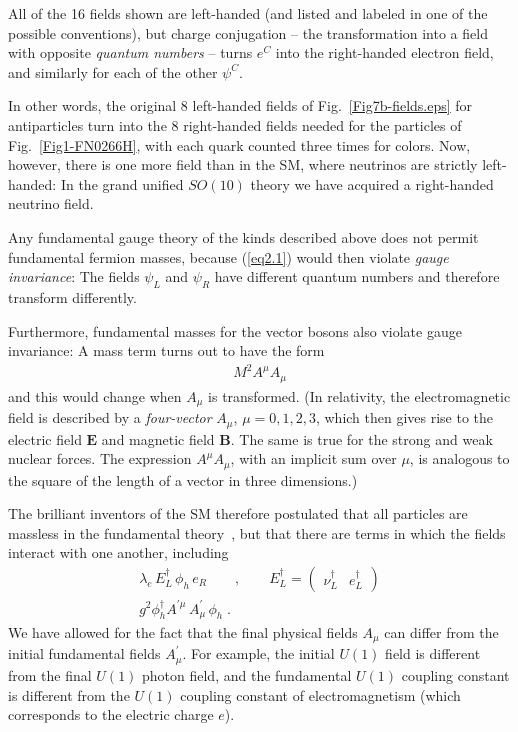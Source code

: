 \documentclass[12pt]{iopart}
\begin{document}
All of the 16 fields shown are left-handed (and listed and labeled in one of the possible conventions), but charge conjugation -- the transformation into a field with opposite \textit{quantum numbers} -- turns $e^{C}$ into the right-handed electron field, and similarly for each of the other $\psi ^C$. 

In other words, the original 8 left-handed fields of Fig.~\ref{Fig7b-fields.eps} for antiparticles turn into the 8 right-handed fields needed for the particles of Fig.~\ref{Fig1-FN0266H}, with each quark counted three times for colors. Now, however, there is one more field than in the SM, where neutrinos are strictly left-handed: In the grand unified $SO(10)$ theory we have acquired a right-handed neutrino field.  

Any fundamental gauge theory of the kinds described above does not permit fundamental fermion masses, because (\ref{eq2.1}) would then violate \textit{gauge invariance}: The fields $\psi _{L}$ and $\psi _{R}$ have different quantum numbers and therefore transform differently. 

Furthermore, fundamental masses for the vector bosons also violate gauge invariance: A mass term turns out to have the form
\begin{eqnarray}
M^{2}A^{\mu }A_{\mu }
\label{eq2.3}
\end{eqnarray}
and this would change when $A_{\mu }$ is transformed. (In relativity, the electromagnetic field is described by a \textit{four-vector} $A_{\mu }$, $\mu=0,1,2,3$,  which then gives rise to the electric field $\mathbf{E}$ and magnetic field $\mathbf{B}$. The same is true for the strong and weak nuclear forces. The expression $A^{\mu }A_{\mu }$, with an implicit sum over $\mu$, is analogous to the square of the length of a vector in three dimensions.)

The brilliant inventors of the SM therefore postulated that all particles are massless in the fundamental theory~\cite{Weinberg,Salam}, but that there are terms in which the fields interact with one another, including
\begin{eqnarray}
\lambda _{e}\,E_{L}^{\dag }\,\phi _{h}\,e_{R}\qquad ,\qquad E_{L}^{\dag}=\left( 
\begin{array}{cc}
\nu _{L}^{\dag } & e_{L}^{\dag }
\end{array}
\right) 
\label{eq2.4} \\
g^{2}\phi _{h} ^{\dag }A^{\prime \mu }\,A_{\mu }^{\prime }\,\phi _{h}
\label{eq2.5} \; .
\end{eqnarray}
We have allowed for the fact that the final physical fields $A_{\mu }$ can differ from the initial fundamental fields $A_{\mu }^{\prime }$. For example, the initial $U(1)$ field is different from the final $U(1)$ photon field, and the fundamental $U(1)$ coupling constant is different from the $U(1)$ coupling constant of electromagnetism (which corresponds to the electric charge $e$).
\end{document}
